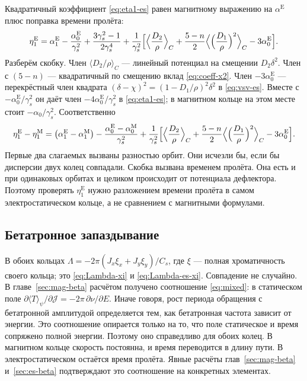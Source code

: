 Квадратичный коэффициент \eqref{eq:eta1-es} равен магнитному выражению на $\alpha^{\mathrm{E}}$ плюс поправка времени пролёта:
\begin{equation}
\label{eq:cmp-eta1}
\eta_1^{\mathrm{E}}
=\alpha_1^{\mathrm{E}}-\frac{\alpha_0^{\mathrm{E}}}{\gamma_s^2}
+\frac{3\gamma_s^2-1}{2\gamma_s^4}
+\frac{1}{\gamma_s^2}\Bigl[
\Bigl\langle\frac{D_2}{\rho}\Bigr\rangle_C
+\frac{5-n}{2}
\Bigl\langle\Bigl(\frac{D_1}{\rho}\Bigr)^2\Bigr\rangle_C
-3\alpha_0^{\mathrm{E}}
\Bigr].
\end{equation}
Разберём скобку. Член $\langle D_2/\rho\rangle_C$ --- линейный потенциал на смещении $D_2\delta^2$. Член с $(5-n)$ --- квадратичный по смещению вклад \eqref{eq:coeff-x2}. Член $-3\alpha_0^{\mathrm{E}}$ --- перекрёстный член квадрата $(\delta-\chi)^2=(1-D_1/\rho)^2\delta^2$ в \eqref{eq:vsv-es}. Вместе с $-\alpha_0^{\mathrm{E}}/\gamma_s^2$ он даёт член $-4\alpha_0^{\mathrm{E}}/\gamma_s^2$ в \eqref{eq:eta1-es}; в магнитном кольце на этом месте стоит $-\alpha_0/\gamma_s^2$. Соответственно
\begin{equation}
\label{eq:cmp-eta1-diff}
\eta_1^{\mathrm{E}}-\eta_1^{\mathrm{M}}
=\bigl(\alpha_1^{\mathrm{E}}-\alpha_1^{\mathrm{M}}\bigr)
-\frac{\alpha_0^{\mathrm{E}}-\alpha_0^{\mathrm{M}}}{\gamma_s^2}
+\frac{1}{\gamma_s^2}\Bigl[
\Bigl\langle\frac{D_2}{\rho}\Bigr\rangle_C
+\frac{5-n}{2}
\Bigl\langle\Bigl(\frac{D_1}{\rho}\Bigr)^2\Bigr\rangle_C
-3\alpha_0^{\mathrm{E}}
\Bigr].
\end{equation}
Первые два слагаемых вызваны разностью орбит. Они исчезли бы, если бы дисперсии двух колец совпадали. Скобка вызвана временем пролёта. Она есть и при одинаковых орбитах и целиком происходит от потенциала дефлектора. Поэтому проверять $\eta_1^{\mathrm{E}}$ нужно разложением времени пролёта в самом электростатическом кольце, а не сравнением с магнитными формулами.

\subsection{Бетатронное запаздывание}

В обоих кольцах $\Lambda=-2\pi(J_x\xi_x+J_y\xi_y)/C_s$, где $\xi$ --- полная хроматичность своего кольца; это \eqref{eq:Lambda-xi} и \eqref{eq:Lambda-es-xi}. Совпадение не случайно. В главе~\ref{sec:mag-beta} расчётом получено соотношение \eqref{eq:mixed}: в статическом поле $\partial\langle T\rangle_\psi/\partial\mathcal{J}=-2\pi\,\partial\nu/\partial E$. Иначе говоря, рост периода обращения с бетатронной амплитудой определяется тем, как бетатронная частота зависит от энергии. Это соотношение опирается только на то, что поле статическое и время сопряжено полной энергии. Поэтому оно справедливо для обоих колец. В магнитном кольце скорость постоянна, и время переводится в длину пути. В электростатическом остаётся время пролёта. Явные расчёты глав~\ref{sec:mag-beta} и~\ref{sec:es-beta} подтверждают это соотношение на конкретных элементах.

